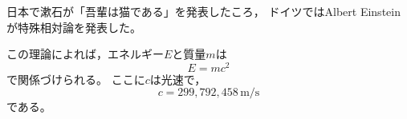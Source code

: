 \documentclass{jsarticle}
\begin{document}
日本で漱石が「吾輩は猫である」を発表したころ，
ドイツではAlbert Einsteinが特殊相対論を発表した。

この理論によれば，エネルギー$E$と質量$m$は
\begin{equation}
  E = mc^{2}
\end{equation}
で関係づけられる。
ここに$c$は光速で，
\begin{equation}
  c = 299{,}792{,}458 \, \mathrm{m/s}
\end{equation}
である。
\end{document}

